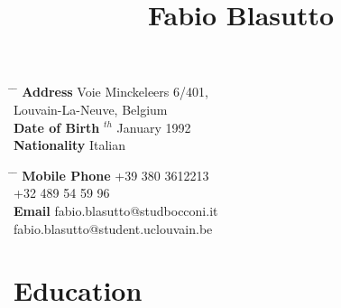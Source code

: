 \documentclass[10pt]{article} %
\begin{document}

\title{Fabio Blasutto} %


\pagestyle{empty}
\parbox{0.5\textwidth}{ %
\begin{tabbing} %
\hspace{3cm} \= \hspace{4cm} \= \kill %
{\bf Address} \> Voie Minckeleers 6/401,\\ %
\>Louvain-La-Neuve, Belgium\\ %
{\bf Date of Birth} $^{th}$ January 1992 \\ %
{\bf Nationality} \> Italian %
\end{tabbing}}
\hfill %
\parbox{0.5\textwidth}{ %
\begin{tabbing} %
\hspace{3cm} \= \hspace{4cm} \= \kill %
{\bf Mobile Phone} \> +39 380 3612213 \\ \>+32 489 54 59 96 \\ %
{\bf Email} \> fabio.blasutto@studbocconi.it \\
\> fabio.blasutto@student.uclouvain.be %
\end{tabbing}}


\section{Education}

\end{document}

